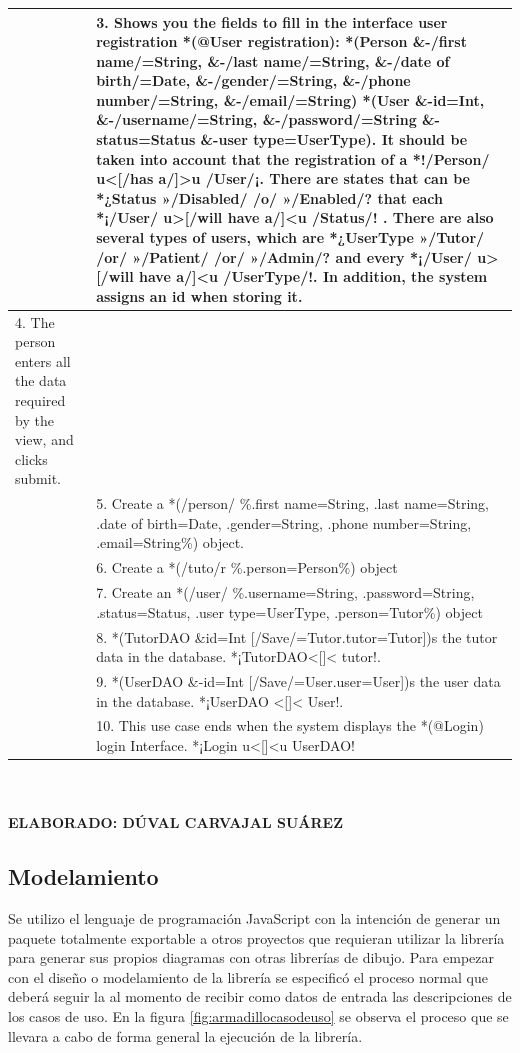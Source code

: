 \begin{table}[]
	\begin{tabular}{| p{7cm} | p{7cm} |}
		\hline
		& 3. Shows you the fields to fill in the interface user registration *(@User registration): *(Person \&-/first name/=String, \&-/last name/=String, \&-/date of birth/=Date, \&-/gender/=String, \&-/phone number/=String, \&-/email/=String) *(User \&-id=Int, \&-/username/=String, \&-/password/=String \&-status=Status \&-user type=UserType). It should be taken into account that the registration of a *!/Person/ u<[/has a/]>u /User/¡. There are states that can be *¿Status »/Disabled/ /o/ »/Enabled/? that each *¡/User/ u>[/will have a/]<u /Status/! . There are also several types of users, which are *¿UserType »/Tutor/ /or/ »/Patient/ /or/ »/Admin/? and every *¡/User/ u>[/will have a/]<u /UserType/!. In addition, the system assigns an id when storing it. \\ \hline
		4. The person enters all the data required by the view, and clicks submit. & \\ \hline
		& 5. Create a *(/person/ \%.first name=String, .last name=String, .date of birth=Date, .gender=String, .phone number=String, .email=String\%) object. \\ \hline
		& 6. Create a *(/tuto/r \%.person=Person\%) object \\ \hline
		& 7. Create an *(/user/ \%.username=String, .password=String, .status=Status, .user type=UserType, .person=Tutor\%) object \\ \hline
		& 8. *(TutorDAO \&id=Int [/Save/=Tutor{.tutor=Tutor}])s the tutor data in the database. *¡TutorDAO<[]< tutor!. \\ \hline
		& 9. *(UserDAO \&-id=Int [/Save/=User{.user=User}])s the user data in the database. *¡UserDAO <[]< User!. \\ \hline
		& 10. This use case ends when the system displays the *(@Login) login Interface. *¡Login u<[]<u UserDAO! \\ \hline
	\end{tabular} \\
\textbf{\\ ELABORADO: DÚVAL CARVAJAL SUÁREZ}
\end{table}

\subsection{Modelamiento}

Se utilizo el lenguaje de programación JavaScript con la intención de generar un paquete totalmente exportable a otros proyectos que requieran utilizar la librería para generar sus propios diagramas con otras librerías de dibujo. Para empezar con el diseño o modelamiento de la librería se especificó el proceso normal que deberá seguir la al momento de recibir como datos de entrada las descripciones de los casos de uso. En la figura \ref{fig:armadillocasodeuso} se observa el proceso que se llevara a cabo de forma general la ejecución de la librería.

